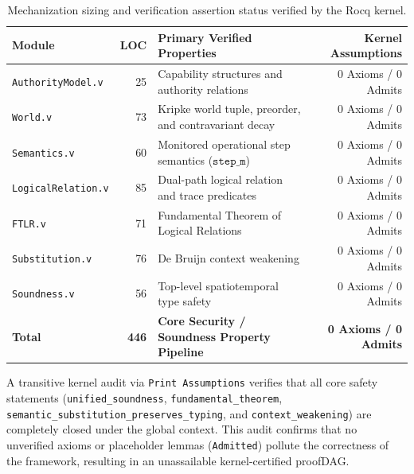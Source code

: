 \begin{table}[h]
\centering
\small
\begin{tabularx}{\textwidth}{l r X r}
\hline
\textbf{Module} & \textbf{LOC} & \textbf{Primary Verified Properties} & \textbf{Kernel Assumptions} \\
\hline
\texttt{AuthorityModel.v} & 25 & Capability structures and authority relations & 0 Axioms / 0 Admits \\
\texttt{World.v} & 73 & Kripke world tuple, preorder, and contravariant decay & 0 Axioms / 0 Admits \\
\texttt{Semantics.v} & 60 & Monitored operational step semantics ($\mathtt{step\_m}$) & 0 Axioms / 0 Admits \\
\texttt{LogicalRelation.v} & 85 & Dual-path logical relation and trace predicates & 0 Axioms / 0 Admits \\
\texttt{FTLR.v} & 71 & Fundamental Theorem of Logical Relations & 0 Axioms / 0 Admits \\
\texttt{Substitution.v} & 76 & De Bruijn context weakening & 0 Axioms / 0 Admits \\
\texttt{Soundness.v} & 56 & Top-level spatiotemporal type safety & 0 Axioms / 0 Admits \\
\hline
\textbf{Total} & \textbf{446} & \textbf{Core Security / Soundness Property Pipeline} & \textbf{0 Axioms / 0 Admits} \\
\hline
\end{tabularx}
\caption{Mechanization sizing and verification assertion status verified by the Rocq kernel.}
\label{tab:proof_metrics}
\end{table}

A transitive kernel audit via \texttt{Print Assumptions} verifies that all core safety statements (\texttt{unified\_soundness}, \texttt{fundamental\_theorem}, \texttt{semantic\_substitution\_preserves\_typing}, and \texttt{context\_weakening}) are completely closed under the global context. This audit confirms that no unverified axioms or placeholder lemmas (\texttt{Admitted}) pollute the correctness of the framework, resulting in an unassailable kernel-certified proofDAG.
